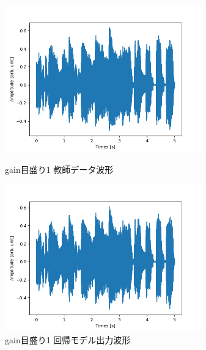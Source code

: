 \documentclass{jreport}		%
\begin{document}
\begin{figure}[htbp]
 \begin{minipage}{0.5\hsize}
  \begin{center}
   \includegraphics[width=85mm]{gain1_output.png}
  \end{center}
  \caption{gain目盛り1 教師データ波形}
  \label{fig:one}
 \end{minipage}
 \begin{minipage}{0.5\hsize}
  \begin{center}
   \includegraphics[width=85mm]{gain1_predict_output.png}
  \end{center}
  \caption{gain目盛り1 回帰モデル出力波形}
  \label{fig:two}
 \end{minipage}
\end{figure}
\end{document}

